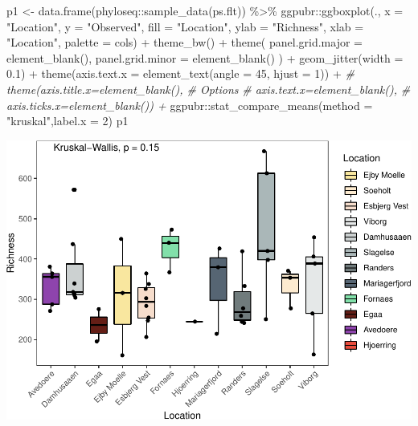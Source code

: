 \documentclass[
]{book}
\newenvironment{Shaded}{\begin{snugshade}}{\end{snugshade}}
\newcommand{\AttributeTok}[1]{\textcolor[rgb]{0.77,0.63,0.00}{#1}}
\newcommand{\CommentTok}[1]{\textcolor[rgb]{0.56,0.35,0.01}{\textit{#1}}}
\newcommand{\DecValTok}[1]{\textcolor[rgb]{0.00,0.00,0.81}{#1}}
\newcommand{\FloatTok}[1]{\textcolor[rgb]{0.00,0.00,0.81}{#1}}
\newcommand{\FunctionTok}[1]{\textcolor[rgb]{0.00,0.00,0.00}{#1}}
\newcommand{\NormalTok}[1]{#1}
\newcommand{\OtherTok}[1]{\textcolor[rgb]{0.56,0.35,0.01}{#1}}
\newcommand{\SpecialCharTok}[1]{\textcolor[rgb]{0.00,0.00,0.00}{#1}}
\newcommand{\StringTok}[1]{\textcolor[rgb]{0.31,0.60,0.02}{#1}}
\begin{document}
\begin{Shaded}
\begin{Highlighting}[]
\NormalTok{p1 }\OtherTok{\textless{}{-}} \FunctionTok{data.frame}\NormalTok{(phyloseq}\SpecialCharTok{::}\FunctionTok{sample\_data}\NormalTok{(ps.flt)) }\SpecialCharTok{\%\textgreater{}\%}
\NormalTok{  ggpubr}\SpecialCharTok{::}\FunctionTok{ggboxplot}\NormalTok{(., }\AttributeTok{x =} \StringTok{"Location"}\NormalTok{, }
                    \AttributeTok{y =} \StringTok{"Observed"}\NormalTok{, }
                    \AttributeTok{fill =} \StringTok{"Location"}\NormalTok{, }
                    \AttributeTok{ylab =} \StringTok{"Richness"}\NormalTok{, }
                    \AttributeTok{xlab =} \StringTok{"Location"}\NormalTok{, }
                    \AttributeTok{palette =}\NormalTok{ cols) }\SpecialCharTok{+}
    \FunctionTok{theme\_bw}\NormalTok{() }\SpecialCharTok{+}
    \FunctionTok{theme}\NormalTok{( }\AttributeTok{panel.grid.major =} \FunctionTok{element\_blank}\NormalTok{(), }\AttributeTok{panel.grid.minor =} \FunctionTok{element\_blank}\NormalTok{() ) }\SpecialCharTok{+}
    \FunctionTok{geom\_jitter}\NormalTok{(}\AttributeTok{width =} \FloatTok{0.1}\NormalTok{) }\SpecialCharTok{+}
   \FunctionTok{theme}\NormalTok{(}\AttributeTok{axis.text.x =} \FunctionTok{element\_text}\NormalTok{(}\AttributeTok{angle =} \DecValTok{45}\NormalTok{, }\AttributeTok{hjust =} \DecValTok{1}\NormalTok{)) }\SpecialCharTok{+} 
\CommentTok{\#    theme(axis.title.x=element\_blank(),  \# Options}
\CommentTok{\#        axis.text.x=element\_blank(),}
\CommentTok{\#        axis.ticks.x=element\_blank()) +}
\NormalTok{  ggpubr}\SpecialCharTok{::}\FunctionTok{stat\_compare\_means}\NormalTok{(}\AttributeTok{method =} \StringTok{"kruskal"}\NormalTok{,}\AttributeTok{label.x =} \DecValTok{2}\NormalTok{)}
\NormalTok{p1}
\end{Highlighting}
\end{Shaded}

\includegraphics{gitbook-demo_files/figure-latex/richness-1.pdf}
\end{document}
